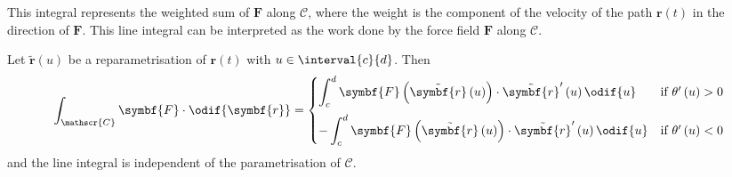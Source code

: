 \documentclass{article}
\begin{document}
This integral represents the weighted sum of \(\symbf{F}\) along
\(\mathscr{C}\), where the weight is the component of the velocity of
the path \(\symbf{r}\left( t \right)\) in the direction of
\(\symbf{F}\). This line integral can be interpreted as the work done
by the force field \(\symbf{F}\) along \(\mathscr{C}\).
\begin{lemma}
    Let \(\tilde{\symbf{r}}\left( u \right)\) be a
    reparametrisation of \(\symbf{r}\left( t \right)\) with \(u \in
    \interval{c}{d}\). Then
    \begin{equation*}
        \int_{\mathscr{C}} \symbf{F} \cdot \odif{\symbf{r}} =
        \begin{cases}
            \displaystyle\int_c^d \symbf{F}\left( \tilde{\symbf{r}}\left( u \right) \right) \cdot \tilde{\symbf{r}}'\left( u \right) \odif{u}  & \text{if } \theta'\left( u \right) > 0 \\[2.5ex]
            -\displaystyle\int_c^d \symbf{F}\left( \tilde{\symbf{r}}\left( u \right) \right) \cdot \tilde{\symbf{r}}'\left( u \right) \odif{u} & \text{if } \theta'\left( u \right) < 0
        \end{cases}
    \end{equation*}
    and the line integral is independent of the parametrisation of
    \(\mathscr{C}\).
\end{lemma}
\end{document}
